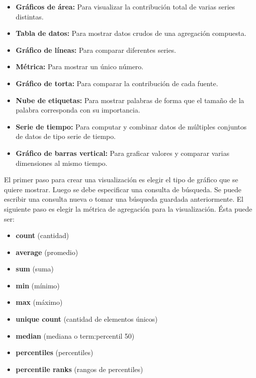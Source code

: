 \begin{itemize}

  \item \textbf{Gráficos de área:}
  Para visualizar la contribución total de varias series distintas.

  \item \textbf{Tabla de datos:}
  Para mostrar datos crudos de una agregación compuesta.

  \item \textbf{Gráfico de líneas:}
  Para comparar diferentes series.

  \item \textbf{Métrica:}
  Para mostrar un único número.

  \item \textbf{Gráfico de torta:}
  Para comparar la contribución de cada fuente.

  \item \textbf{Nube de etiquetas:}
  Para mostrar palabras de forma que el tamaño de la palabra corresponda con su importancia.

  \item \textbf{Serie de tiempo:}
  Para computar y combinar datos de múltiples conjuntos de datos de tipo serie de tiempo.

  \item \textbf{Gráfico de barras vertical:}
  Para graficar valores y comparar varias dimensiones al mismo tiempo.

\end{itemize}

El primer paso para crear una visualización es elegir el tipo de gráfico que se
quiere mostrar. Luego se debe especificar una consulta de búsqueda. Se puede
escribir una consulta nueva o tomar una búsqueda guardada anteriormente. El
siguiente paso es elegir la métrica de agregación para la visualización. Ésta
puede ser:

\begin{itemize}
  \item \textbf{count} (cantidad)
  \item \textbf{average} (promedio)
  \item \textbf{sum} (suma)
  \item \textbf{min} (mínimo)
  \item \textbf{max} (máximo)
  \item \textbf{unique count} (cantidad de elementos únicos)
  \item \textbf{median} (mediana o \gls{term:percentil} 50)
  \item \textbf{percentiles} (percentiles)
  \item \textbf{percentile ranks} (rangos de percentiles)
\end{itemize}

